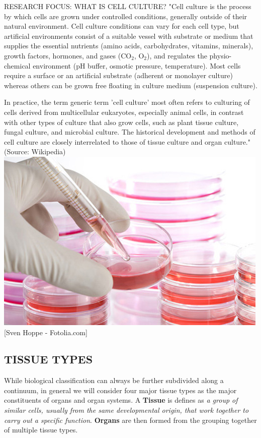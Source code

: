 \documentclass[10pt,twoside,twocolumn]{article}
\begin{document}
\begin{paperbox}{RESEARCH FOCUS: WHAT IS CELL CULTURE?}
"Cell culture is the process by which cells are grown under controlled conditions, generally outside of their natural environment. Cell culture conditions can vary for each cell type, but artificial environments consist of a suitable vessel with substrate or medium that supplies the essential nutrients (amino acids, carbohydrates, vitamins, minerals), growth factors, hormones, and gases (CO$_2$, O$_2$), and regulates the physio-chemical environment (pH buffer, osmotic pressure, temperature). Most cells require a surface or an artificial substrate (adherent or monolayer culture) whereas others can be grown free floating in culture medium (suspension culture).

In practice, the term generic term 'cell culture' most often refers to  culturing of cells derived from multicellular eukaryotes, especially animal cells, in contrast with other types of culture that also grow cells, such as plant tissue culture, fungal culture, and microbial culture. The historical development and methods of cell culture are closely interrelated to those of tissue culture and organ culture." (Source: Wikipedia)
\includegraphics[width=\textwidth]{CElCulture.jpg}
[Sven Hoppe - Fotolia.com]
\end{paperbox}

\subsection{TISSUE TYPES}
While biological classification can always be further subdivided along a continuum, in general we will consider four major tissue types as the major constituents of organs and organ systems.  A \textbf{Tissue} is defines as \textit{a group of similar cells, usually from the same developmental origin, that work together to carry out a specific function}. \textbf{Organs} are then formed from the grouping together of multiple tissue types.
\end{document}

